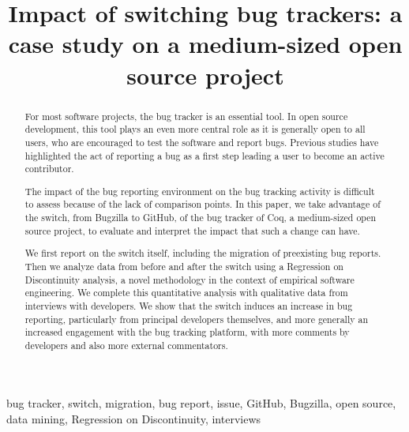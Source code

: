 \documentclass[conference]{IEEEtran}
\begin{document}
%
\title{Impact of switching bug trackers: a case study on a medium-sized open source project}
%
%
\maketitle
%
\begin{abstract}
For most software projects, the bug tracker is an essential tool. In open source development, this tool plays an even more central role as it is generally open to all users, who are encouraged to test the software and report bugs. Previous studies have highlighted the act of reporting a bug as a first step leading a user to become an active contributor.

The impact of the bug reporting environment on the bug tracking activity is difficult to assess because of the lack of comparison points. In this paper, we take advantage of the switch, from Bugzilla to GitHub, of the bug tracker of Coq, a medium-sized open source project, to evaluate and interpret the impact that such a change can have.

We first report on the switch itself, including the migration of preexisting bug reports. Then we analyze data from before and after the switch using a Regression on Discontinuity analysis, a novel methodology in the context of empirical software engineering. We complete this quantitative analysis with qualitative data from interviews with developers.
We show that the switch induces an increase in bug reporting, particularly from principal developers themselves, and more generally an increased engagement with the bug tracking platform, with more comments by developers and also more external commentators.
\end{abstract}


\begin{IEEEkeywords}
bug tracker, switch, migration, bug report, issue, GitHub, Bugzilla, open source, data mining, Regression on Discontinuity, interviews
\end{IEEEkeywords}
%
%
%
\end{document}
